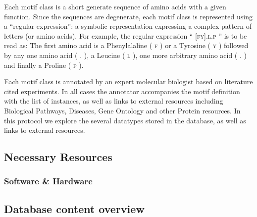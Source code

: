 \documentclass[12pt]{article}
\newcounter{proto}
\newcommand\motif[1]{%
    \textsc{\lowercase{#1}}%
}
\begin{document}
Each motif class is a short generate sequence of amino acids with a given
function. Since the sequences are degenerate, each motif class is represented
using a ``regular expression'': a symbolic representation expressing a complex
pattern of letters (or amino acids). For example, the regular expression
``\motif{[FY].L.P}'' is to be read as: The first amino acid is a Phenylalaline (\motif{F}) or a
Tyrosine (\motif{Y}) followed by any one amino acid (\motif{.}), a Leucine (\motif{L}), one more
arbitrary amino acid (\motif{.}) and finally a Proline (\motif{P}).

Each motif class is annotated by an expert molecular biologist based on
literature cited experiments.
In all cases the annotator accompanies the motif definition with the list of
instances, as well as links to external resources including Biological
Pathways, Diseases, Gene Ontology and other Protein resources. In this protocol
we explore the several datatypes stored in the database, as well as links to
external resources.

%
%
\subsection*{Necessary Resources}
\subsubsection*{Software \& Hardware}



%
%
\subsection*{Database content overview}%
\label{subsec:explore_content_database}%
\end{document}
